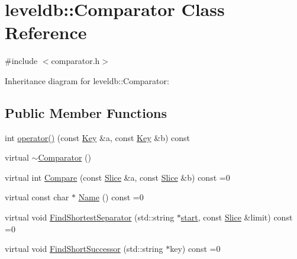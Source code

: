 \hypertarget{structleveldb_1_1_comparator}{\section{leveldb\-:\-:Comparator Class Reference}
\label{structleveldb_1_1_comparator}
}


{\ttfamily \#include $<$comparator.\-h$>$}



Inheritance diagram for leveldb\-:\-:Comparator\-:
\subsection*{Public Member Functions}
\begin{DoxyCompactItemize}
\item 
int \hyperlink{structleveldb_1_1_comparator_a2c2009828869475d8375c84d65cf1c24}{operator()} (const \hyperlink{namespaceleveldb_a7e9a9725b13fa0bd922d885280dfab95}{Key} \&a, const \hyperlink{namespaceleveldb_a7e9a9725b13fa0bd922d885280dfab95}{Key} \&b) const 
\item 
virtual \hyperlink{structleveldb_1_1_comparator_a88fe2a99620c746932a8ef3ee46e8960}{$\sim$\-Comparator} ()
\item 
virtual int \hyperlink{structleveldb_1_1_comparator_a05dae6edcad3c7db23827c0233d74039}{Compare} (const \hyperlink{classleveldb_1_1_slice}{Slice} \&a, const \hyperlink{classleveldb_1_1_slice}{Slice} \&b) const =0
\item 
virtual const char $\ast$ \hyperlink{structleveldb_1_1_comparator_a888b039bdd6d59517dca75fb40721f5e}{Name} () const =0
\item 
virtual void \hyperlink{structleveldb_1_1_comparator_abdfe6076225e95b91ffd94f646063115}{Find\-Shortest\-Separator} (std\-::string $\ast$\hyperlink{db__bench_8cc_ab376b87f96a574a793c03c53e75afec8}{start}, const \hyperlink{classleveldb_1_1_slice}{Slice} \&limit) const =0
\item 
virtual void \hyperlink{structleveldb_1_1_comparator_a49751dd906595633161dfad943d24b3b}{Find\-Short\-Successor} (std\-::string $\ast$key) const =0
\end{DoxyCompactItemize}


